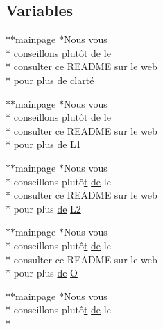 \subsection*{Variables}
\begin{DoxyCompactItemize}
\item 
$\ast$$\ast$mainpage $\ast$Nous vous \\*
conseillons plutô\hyperlink{gl_8h_a00140d6f5c548b26daf170bf16e86a6d}{t} \hyperlink{mainpage_8dox_ab37fa35e77d95c6d0d0ab620c97c3db8}{de} le \\*
consulter ce R\-E\-A\-D\-M\-E sur le web \\*
pour plus \hyperlink{mainpage_8dox_ab37fa35e77d95c6d0d0ab620c97c3db8}{de} \hyperlink{mainpage_8dox_aaa7d01b20e9495683b5080988ab310f6}{clarté}
\item 
$\ast$$\ast$mainpage $\ast$Nous vous \\*
conseillons plutô\hyperlink{gl_8h_a00140d6f5c548b26daf170bf16e86a6d}{t} \hyperlink{mainpage_8dox_ab37fa35e77d95c6d0d0ab620c97c3db8}{de} le \\*
consulter ce R\-E\-A\-D\-M\-E sur le web \\*
pour plus \hyperlink{mainpage_8dox_ab37fa35e77d95c6d0d0ab620c97c3db8}{de} \hyperlink{mainpage_8dox_a539938753ffc9192d1d78c75df43d627}{L1}
\item 
$\ast$$\ast$mainpage $\ast$Nous vous \\*
conseillons plutô\hyperlink{gl_8h_a00140d6f5c548b26daf170bf16e86a6d}{t} \hyperlink{mainpage_8dox_ab37fa35e77d95c6d0d0ab620c97c3db8}{de} le \\*
consulter ce R\-E\-A\-D\-M\-E sur le web \\*
pour plus \hyperlink{mainpage_8dox_ab37fa35e77d95c6d0d0ab620c97c3db8}{de} \hyperlink{mainpage_8dox_a6cd08d66186ab814d4376a13bff53d31}{L2}
\item 
$\ast$$\ast$mainpage $\ast$Nous vous \\*
conseillons plutô\hyperlink{gl_8h_a00140d6f5c548b26daf170bf16e86a6d}{t} \hyperlink{mainpage_8dox_ab37fa35e77d95c6d0d0ab620c97c3db8}{de} le \\*
consulter ce R\-E\-A\-D\-M\-E sur le web \\*
pour plus \hyperlink{mainpage_8dox_ab37fa35e77d95c6d0d0ab620c97c3db8}{de} \hyperlink{mainpage_8dox_abdf7c4e28de4c462789e8ddbcdd8d9a9}{O}
\item 
$\ast$$\ast$mainpage $\ast$Nous vous \\*
conseillons plutô\hyperlink{gl_8h_a00140d6f5c548b26daf170bf16e86a6d}{t} \hyperlink{mainpage_8dox_ab37fa35e77d95c6d0d0ab620c97c3db8}{de} le \\*
$$
\end{DoxyCompactItemize}
